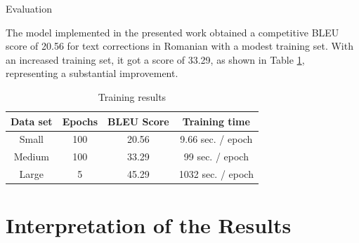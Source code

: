\documentclass[]{beamer}
\begin{document}
        \begin{frame}{Evaluation}
            
            The model implemented in the presented work obtained a competitive BLEU score of 20.56 for text corrections in Romanian with a modest training set. With an increased training set, it got a score of 33.29, as shown in Table \ref{tab:training-results}, representing a substantial improvement.
            
            \begin{table}[h]
                \caption{Training results}
                \label{tab:training-results}
                \centering
                \begin{tabular}{|c|c|c|c|}
                    \hline
                    Data set & Epochs & BLEU Score & Training time     \\
                    \hline
                    Small    & 100    & 20.56      & 9.66 sec. / epoch \\
                    \hline
                    Medium   & 100    & 33.29      & 99 sec. / epoch   \\
                    \hline
                    Large    & 5      & 45.29      & 1032 sec. / epoch \\
                    \hline
                \end{tabular}
            \end{table}
            
        \end{frame}
        
    \section{Interpretation of the Results}
        
\end{document}
